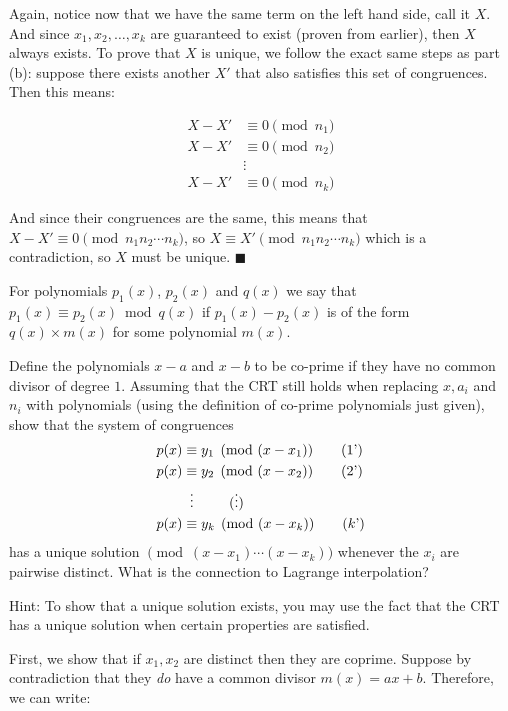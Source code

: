 \documentclass[11pt]{article}
\begin{document}
\begin{Parts}
\begin{solution}
    Again, notice now that we have the same term on the left hand side, call it $X$. And since $x_1, x_2, \dots , x_k$ are guaranteed to exist (proven from earlier), then $X$ always exists. To prove that $X$ is unique, we follow the exact same steps as part (b): suppose there exists another $X'$ that also satisfies this set of congruences. Then this means:

    \begin{align*}
        X - X' &\equiv 0 \pmod{n_1}\\
        X - X' &\equiv 0 \pmod{n_2}\\
        &\vdots \\
        X - X' &\equiv 0 \pmod{n_k}
    \end{align*}

    And since their congruences are the same, this means that $X - X' \equiv 0 \pmod{n_1n_2\cdots n_k}$, so $X \equiv X' \pmod{n_1n_2\cdots n_k}$ which is a contradiction, so $X$ must be unique. $\blacksquare$

\end{solution}

\Part For polynomials $p_1 (x)$, $p_2 (x)$ and $q(x)$ we say that $p_1(x) \equiv p_2 (x) \bmod{q(x)}$ if $p_1 (x) - p_2 (x)$ is of the form $q (x) \times m(x)$ for some polynomial $m(x)$.

Define the polynomials $x-a$ and $x-b$ to be co-prime if they have no common divisor
of degree $1$. Assuming that the CRT still holds when replacing $x, a_i$ and $n_i$ with
polynomials (using the definition of co-prime polynomials just given), show that the system
of congruences
\begin{align}
    p(x) & \equiv y_1 \pmod{(x-x_1)} \tag{1'} \\
    p(x) & \equiv y_2 \pmod{(x-x_2)} \tag{2'} \\
    &\vdotswithin{\equiv} \tag{$\vdots$} \\
    p(x) & \equiv y_k \pmod{(x-x_k)} \tag{$k$'}
\end{align}
has a unique solution $\pmod{(x-x_1)\cdots(x-x_k)}$ whenever the $x_i$ are pairwise
distinct. What is the connection to Lagrange interpolation?

Hint: To show that a unique solution exists, you may use the fact that the CRT has a unique solution when certain properties are satisfied.


\begin{solution}
    First, we show that if $x_1, x_2$ are distinct then they are coprime. Suppose by contradiction that they \textit{do} have a common divisor $m(x) = ax + b$. Therefore, we can write:


\end{solution}
\end{Parts}
\end{document}
